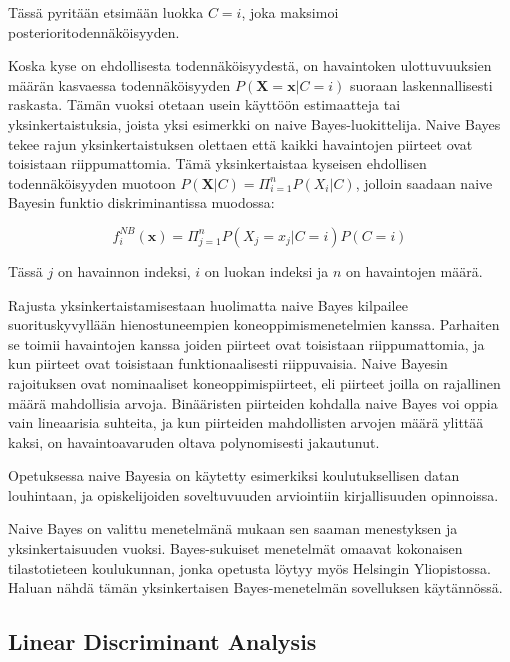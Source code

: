 \documentclass[finnish,twoside,openright]{HYgraduMLDS}
\begin{document}
Tässä pyritään etsimään luokka $C = i$, joka maksimoi posterioritodennäköisyyden.

Koska kyse on ehdollisesta todennäköisyydestä, on havaintoken ulottuvuuksien määrän kasvaessa todennäköisyyden $P(\textbf{X} = \textbf{x}|C=i)$ suoraan laskennallisesti raskasta. Tämän vuoksi otetaan usein käyttöön estimaatteja tai yksinkertaistuksia, joista yksi esimerkki on naive Bayes-luokittelija. Naive Bayes tekee rajun yksinkertaistuksen olettaen että kaikki havaintojen piirteet ovat toisistaan riippumattomia. Tämä yksinkertaistaa kyseisen ehdollisen todennäköisyyden muotoon $P(\textbf{X}|C) = \Pi^n_{i=1} P(X_i | C)$, jolloin saadaan naive Bayesin funktio diskriminantissa muodossa:

\begin{equation}
    f^{NB}_i(\textbf{x}) = \Pi^n_{j=1} P(X_j=x_j | C=i) P(C=i)
\end{equation}

Tässä $j$ on havainnon indeksi, $i$ on luokan indeksi ja $n$ on havaintojen määrä. 

Rajusta yksinkertaistamisestaan huolimatta naive Bayes kilpailee suorituskyvyllään hienostuneempien koneoppimismenetelmien kanssa\cite{rish2001empirical}. Parhaiten se toimii havaintojen kanssa joiden piirteet ovat toisistaan riippumattomia, ja kun piirteet ovat toisistaan funktionaalisesti riippuvaisia. Naive Bayesin rajoituksen ovat nominaaliset koneoppimispiirteet, eli piirteet joilla on rajallinen määrä mahdollisia arvoja. Binääristen piirteiden kohdalla naive Bayes voi oppia vain lineaarisia suhteita, ja kun piirteiden mahdollisten arvojen määrä ylittää kaksi, on havaintoavaruden oltava polynomisesti jakautunut\cite{rish2001empirical}.

Opetuksessa naive Bayesia on käytetty esimerkiksi koulutuksellisen datan louhintaan\cite{bhardwaj2012data}, ja opiskelijoiden soveltuvuuden arviointiin kirjallisuuden opinnoissa\cite{hellas2018predicting}.

Naive Bayes on valittu menetelmänä mukaan sen saaman menestyksen ja yksinkertaisuuden vuoksi. Bayes-sukuiset menetelmät omaavat kokonaisen tilastotieteen koulukunnan, jonka opetusta löytyy myös Helsingin Yliopistossa. Haluan nähdä tämän yksinkertaisen Bayes-menetelmän sovelluksen käytännössä.


\subsection{Linear Discriminant Analysis}
\end{document}
